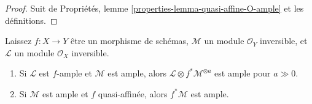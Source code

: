 \begin{proof}
Suit de Propriétés, lemme \ref{properties-lemma-quasi-affine-O-ample} et les définitions.
\end{proof}

\begin{lemma}

\label{lemma-pullback-ample-tensor-relatively-ample}
Laissez $f : X \to Y$ être un morphisme de schémas, $\mathcal{M}$ un module $\mathcal{O}_Y$ inversible, et $\mathcal{L}$ un module $\mathcal{O}_X$ inversible.
\begin{enumerate}
\item Si $\mathcal{L}$ est $f$-ample et $\mathcal{M}$ est ample, alors $\mathcal{L} \otimes f^*\mathcal{M}^{\otimes a}$ est ample pour $a \gg 0$.
\item Si $\mathcal{M}$ est ample et $f$ quasi-affinée, alors $f^*\mathcal{M}$ est ample.
\end{enumerate}

\end{lemma}


